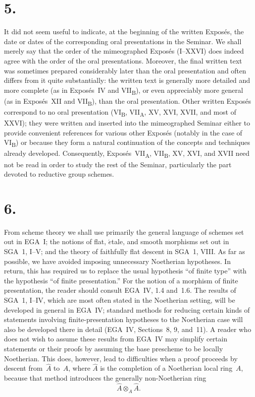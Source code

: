 \section*{5.}

It did not seem useful to indicate, at the beginning of the written Expos\'es, the
date or dates of the corresponding oral presentations in the Seminar.  We shall
merely say that the order of the mimeographed Expos\'es (I--XXVI) does indeed agree
with the order of the oral presentations.  Moreover, the final written text was
sometimes prepared considerably later than the oral presentation and often differs
from it quite substantially: the written text is generally more detailed and more
complete (as in Expos\'es~IV and VII\textsubscript{B}), or even appreciably more
general (as in Expos\'es~XII and VII\textsubscript{B}), than the oral presentation.
Other written Expos\'es correspond to no oral presentation
(VI\textsubscript{B}, VII\textsubscript{A}, XV, XVI, XVII, and most of XXVI); they
were written and inserted into the mimeographed Seminar either to provide convenient
references for various other Expos\'es (notably in the case of
VI\textsubscript{B}) or because they form a natural continuation of the concepts
and techniques already developed.  Consequently, Expos\'es~VII\textsubscript{A},
VII\textsubscript{B}, XV, XVI, and XVII need not be read in order to study the rest
of the Seminar, particularly the part devoted to reductive group schemes.

\section*{6.}

From scheme theory we shall use primarily the general language of schemes set out in
EGA~I; the notions of flat, \(\acute{e}\)tale, and smooth morphisms set out in
SGA~1, I--V; and the theory of faithfully flat descent in SGA~1, VIII.  As far as
possible, we have avoided imposing unnecessary Noetherian hypotheses.  In return,
this has required us to replace the usual hypothesis ``of finite type'' with the
hypothesis ``of finite presentation.''  For the notion of a morphism of finite
presentation, the reader should consult EGA~IV, 1.4 and~1.6.  The results of
SGA~1, I--IV, which are most often stated in the Noetherian setting, will be
developed in general in EGA~IV; standard methods for reducing certain kinds of statements involving
finite-presentation hypotheses to the Noetherian case will also be developed there
in detail (EGA~IV, Sections~8, 9, and~11).  A reader who does not wish to assume
these results from EGA~IV may simplify certain statements or their proofs by
assuming the base prescheme to be locally Noetherian.  This does, however, lead to
difficulties when a proof proceeds by descent from~$\widehat A$ to~$A$, where
$\widehat A$ is the completion of a Noetherian local ring~$A$, because that method
introduces the generally non-Noetherian ring
\[
  \widehat A\otimes_A\widehat A.
\]


